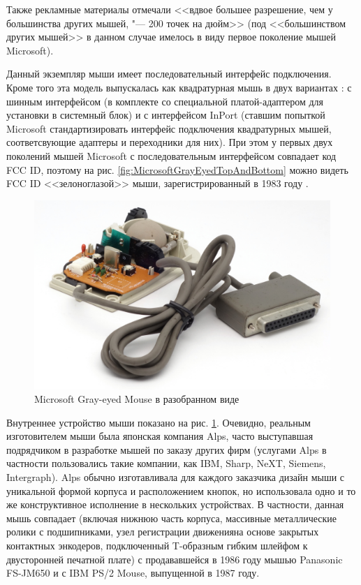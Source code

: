 \documentclass[11pt, a4paper]{article}
\begin{document}
Также рекламные материалы отмечали <<вдвое большее разрешение, чем у большинства других мышей, "--- 200 точек на дюйм>> (под <<большинством других мышей>> в данном случае имелось в виду первое поколение мышей Microsoft).

Данный экземпляр мыши имеет последовательный интерфейс подключения. Кроме того эта модель выпускалась как квадратурная мышь в двух вариантах \cite{guide}: с шинным интерфейсом (в комплекте со специальной платой-адаптером для установки в системный блок) и с интерфейсом InPort (ставшим попыткой Microsoft стандартизировать интерфейс подключения квадратурных мышей,  соответсвующие адаптеры и переходники для них). При этом у первых двух поколений мышей Microsoft с последовательным интерфейсом совпадает код FCC ID, поэтому на рис. \ref{fig:MicrosoftGrayEyedTopAndBottom} можно видеть FCC ID <<зелоноглазой>> мыши, зарегистрированный в 1983 году \cite{zero}.

\begin{figure}[h]
    \centering
    \includegraphics[scale=0.5]{1985_microsoft_gray_eyed_mouse/inside_30.jpg}
    \caption{Microsoft Gray-eyed Mouse в разобранном виде}
    \label{fig:MicrosoftGrayEyedInside}
\end{figure}

Внутреннее устройство мыши показано на рис. \ref{fig:MicrosoftGrayEyedInside}. Очевидно, реальным изготовителем мыши была японская компания Alps, часто выступавшая подрядчиком в разработке мышей по заказу других фирм (услугами Alps в частности пользовались такие компании, как IBM, Sharp, NeXT,  Siemens, Intergraph). Alps обычно изготавливала для каждого заказчика дизайн мыши с уникальной формой корпуса и расположением кнопок, но использовала одно и то же конструктивное исполнение в нескольких устройствах. В частности, данная мышь совпадает (включая нижнюю часть корпуса, массивные металлические ролики с подшипниками, узел регистрации движенияна основе закрытых контактных энкодеров, подключенный T-образным гибким шлейфом к двусторонней печатной плате) с продававшейся в 1986 году мышью Panasonic FS-JM650 и с IBM PS/2 Mouse, выпущенной в 1987 году.
\end{document}
